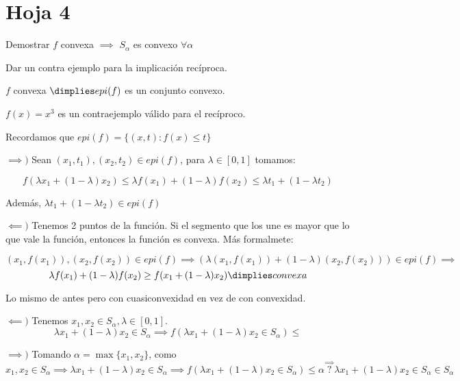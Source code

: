 \section{Hoja 4}


\begin{problem}[1]

\ppart
Demostrar $f$ convexa $\implies$ $S_{\alpha}$ es convexo $\forall \alpha$

Dar un contra ejemplo para la implicación recíproca.

\ppart $f$ convexa $\dimplies epi(f)$ es un conjunto convexo.

\solution

\spart $f(x) = x^3$  es un contraejemplo válido para el recíproco.

\spart Recordamos que $epi(f) = \{(x,t) : f(x) \leq t\}$

$\implies)$ Sean $(x_1,t_1),(x_2,t_2)\in epi(f)$, para $\lambda \in [0,1]$ tomamos:

\[
 f(\lambda x_1 + (1-\lambda) x_2) \leq \lambda f(x_1) + (1-\lambda) f(x_2) \leq \lambda t_1 + (1-\lambda t_2)
 \]

Además, $\lambda t_1 + (1-\lambda t_2) \in epi(f)$


$\impliedby)$ Tenemos 2 puntos de la función.
%
Si el segmento que los une es mayor que lo que vale la función, entonces la función es convexa.
%
Más formalmete:

\[
    (x_1,f(x_1)),(x_2,f(x_2)) \in epi(f) \implies \left(\lambda (x_1,f(x_1)) + (1-\lambda) (x_2,f(x_2))\right) \in epi(f) \implies\]
    \[ \lambda f(x_1) + (1-\lambda) f(x_2) \geq f(x_1 + (1-\lambda) x_2) \dimplies convexa
\]


\end{problem}

\begin{problem}[2]
Lo mismo de antes pero con cuasiconvexidad en vez de con convexidad.

\solution

$\impliedby)$ Tenemos $x_1,x_2 \in S_{\alpha},\lambda \in [0,1]$.
\[
    \lambda x_1 + (1-\lambda) x_2 \in S_{\alpha} \implies f(\lambda x_1 + (1-\lambda) x_2 \in S_{\alpha}) \leq
\]


$\implies)$ Tomando $\alpha=  \max\{x_1,x_2\}$, como
\[x_1,x_2 \in S_{\alpha} \implies \lambda x_1 + (1-\lambda) x_2 \in S_{\alpha} \implies f(\lambda x_1 + (1-\lambda) x_2 \in S_{\alpha}) \leq \alpha \overset{\implies}{?} \lambda x_1 + (1-\lambda) x_2 \in S_{\alpha} \in S_{\alpha}\]
\end{problem}


